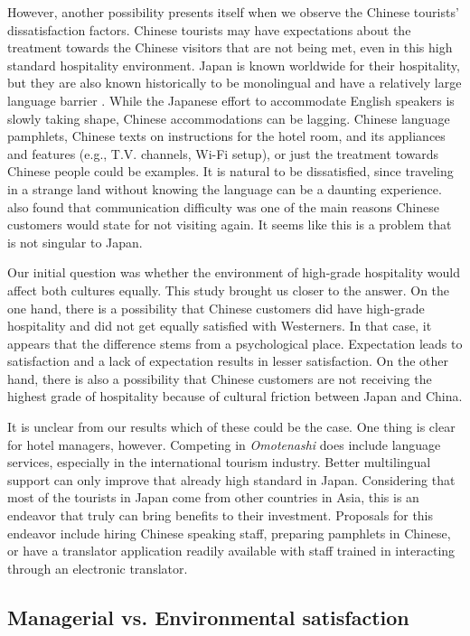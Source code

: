 \documentclass[smallextended,natbib]{svjour3}       %
\begin{document}
    However, another possibility presents itself when we observe the Chinese tourists' dissatisfaction factors. Chinese tourists may have expectations about the treatment towards the Chinese visitors that are not being met, even in this high standard hospitality environment. Japan is known worldwide for their hospitality, but they are also known historically to be monolingual and have a relatively large language barrier \cite{heinrich2012making, coulmas2002japan}. While the Japanese effort to accommodate English speakers is slowly taking shape, Chinese accommodations can be lagging. Chinese language pamphlets, Chinese texts on instructions for the hotel room, and its appliances and features (e.g., T.V. channels, Wi-Fi setup), or just the treatment towards Chinese people could be examples. It is natural to be dissatisfied, since traveling in a strange land without knowing the language can be a daunting experience. \cite{ryan2001} also found that communication difficulty was one of the main reasons Chinese customers would state for not visiting again. It seems like this is a problem that is not singular to Japan.

    Our initial question was whether the environment of high-grade hospitality would affect both cultures equally. This study brought us closer to the answer. On the one hand, there is a possibility that Chinese customers did have high-grade hospitality and did not get equally satisfied with Westerners. In that case, it appears that the difference stems from a psychological place. Expectation leads to satisfaction and a lack of expectation results in lesser satisfaction. On the other hand, there is also a possibility that Chinese customers are not receiving the highest grade of hospitality because of cultural friction between Japan and China. 

    It is unclear from our results which of these could be the case. One thing is clear for hotel managers, however. Competing in \textit{Omotenashi} does include language services, especially in the international tourism industry. Better multilingual support can only improve that already high standard in Japan. Considering that most of the tourists in Japan come from other countries in Asia, this is an endeavor that truly can bring benefits to their investment. Proposals for this endeavor include hiring Chinese speaking staff, preparing pamphlets in Chinese, or have a translator application readily available with staff trained in interacting through an electronic translator.

  \subsection{Managerial vs. Environmental satisfaction}\label{disc:man_env}
\end{document}
